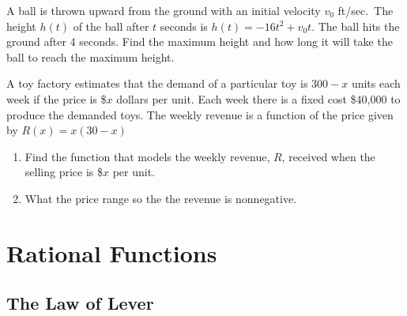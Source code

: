 \documentclass[
  en,11pt]{elegantbook}
\let\BeginKnitrBlock\begin \let\EndKnitrBlock\end
\begin{document}
\BeginKnitrBlock{exercise}
\protect\hypertarget{exr:unnamed-chunk-273}{}{\label{exr:unnamed-chunk-273} }
A ball is thrown upward from the ground with an initial velocity \(v_0\) ft/sec.~The height \(h(t)\) of the ball after \(t\) seconds is \(h(t)= -16t^2 + v_0t\). The ball hits the ground after 4 seconds.
Find the maximum height and how long it will take the ball to reach the maximum height.
\EndKnitrBlock{exercise}

\BeginKnitrBlock{exercise}
\protect\hypertarget{exr:unnamed-chunk-274}{}{\label{exr:unnamed-chunk-274} }
A toy factory estimates that the demand of a particular toy is \(300 -x\) units each week if the price is \$\(x\) dollars per unit. Each week there is a fixed cost \$40,000 to produce the demanded toys.
The weekly revenue is a function of the price given by \(R(x)=x(30-x)\)

\begin{enumerate}
\def\labelenumi{\arabic{enumi}.}

\item
  Find the function that models the weekly revenue, \(R\), received when the selling price is \$\(x\) per unit.
\item
  What the price range so the the revenue is nonnegative.
\end{enumerate}
\EndKnitrBlock{exercise}

\hypertarget{rational-functions}{%
\chapter{Rational Functions}\label{rational-functions}}

\hypertarget{the-law-of-lever}{%
\section{The Law of Lever}\label{the-law-of-lever}}
\end{document}
